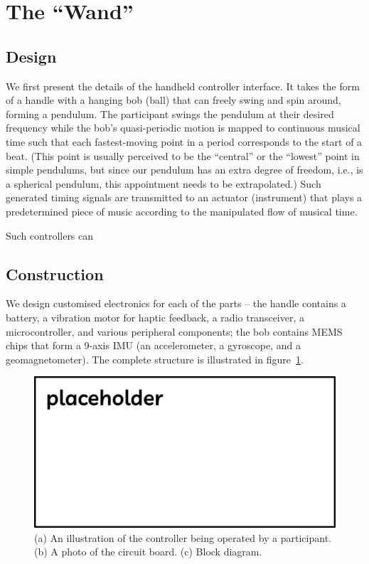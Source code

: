 \documentclass{nime-alternate} %
\begin{document}
\section{The ``Wand''}

\subsection{Design}
We first present the details of the handheld controller interface. It takes the form of a handle with a hanging bob (ball) that can freely swing and spin around, forming a pendulum. The participant swings the pendulum at their desired frequency while the bob's quasi-periodic motion is mapped to continuous musical time such that each fastest-moving point in a period corresponds to the start of a beat. (This point is usually perceived to be the ``central'' or the ``lowest'' point in simple pendulums, but since our pendulum has an extra degree of freedom, i.e., is a spherical pendulum, this appointment needs to be extrapolated.) Such generated timing signals are transmitted to an actuator (instrument) that plays a predetermined piece of music according to the manipulated flow of musical time.

Such controllers can 

\subsection{Construction}
We design customised electronics for each of the parts -- the handle contains a battery, a vibration motor for haptic feedback, a radio transceiver, a microcontroller, and various peripheral components; the bob contains MEMS chips that form a 9-axis IMU (an accelerometer, a gyroscope, and a geomagnetometer). The complete structure is illustrated in figure~\ref{fig:WandConstruction}.

\begin{figure}[htbp]
  \centering
  \includegraphics[width=1\textwidth]{placeholder.png}
  \caption{(a) An illustration of the controller being operated by a participant. (b) A photo of the circuit board. (c) Block diagram.}
  \label{fig:WandConstruction}
\end{figure}
\end{document}
